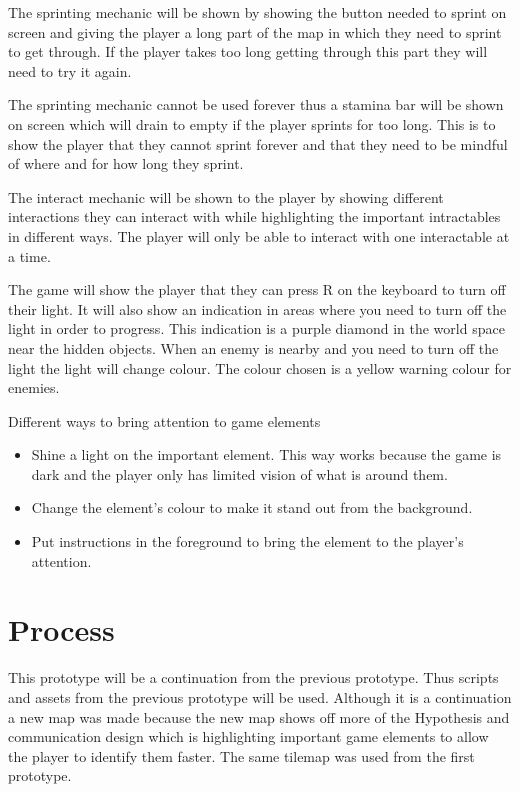 \documentclass{article}
\begin{document}
The sprinting mechanic will be shown by showing the button needed to sprint on screen
and giving the player a long part of the map in which they need to sprint to get through.
If the player takes too long getting through this part they will need to try it again.

The sprinting mechanic cannot be used forever thus a stamina bar will be shown on screen
which will drain to empty if the player sprints for too long. This is to show the player
that they cannot sprint forever and that they need to be mindful of where and for how
long they sprint.

The interact mechanic will be shown to the player by showing different interactions they can
interact with while highlighting the important intractables in different ways. The player
will only be able to interact with one interactable at a time.

The game will show the player that they can press R on the keyboard to turn off their light. It will also show
an indication in areas where you need to turn off the light in order to progress. This indication
is a purple diamond in the world space near the hidden objects. 
When an enemy is nearby and you need to turn off the light the light will change colour. 
The colour chosen is a yellow warning colour for enemies.

Different ways to bring attention to game elements
\begin{itemize}
    \item Shine a light on the important element. This way works because the game is
    dark and the player only has limited vision of what is around them.
    \item Change the element's colour to make it stand out from the background.
    \item Put instructions in the foreground to bring the element to the player's attention.
\end{itemize}

\section{Process}
This prototype will be a continuation from the previous prototype. Thus scripts and assets
from the previous prototype will be used. Although it is a continuation a new map was made because the new
map shows off more of the Hypothesis and communication design which is highlighting important game elements to allow
the player to identify them faster. The same tilemap was used from the first prototype.
\end{document}
